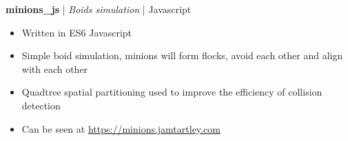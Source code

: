 \textbf{minions_js} | \textit{Boids simulation} | {Javascript}
\begin{itemize}
    \item Written in ES6 Javascript
    \item Simple boid simulation, minions will form flocks, avoid each other and align with each other
    \item Quadtree spatial partitioning used to improve the efficiency of collision detection
    \item Can be seen at \href{https://minions.jamtartley.com}{https://minions.jamtartley.com}
\end{itemize}
